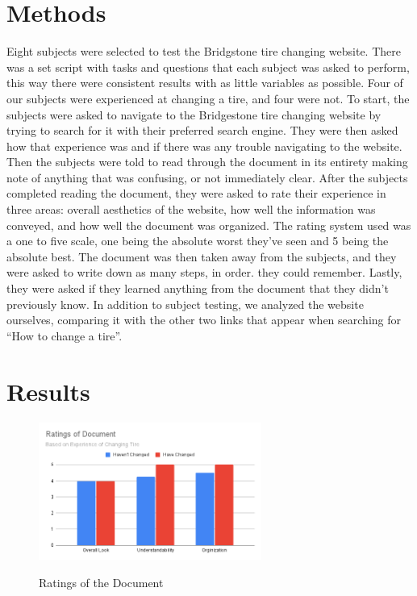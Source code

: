 \documentclass[12pt,A4paper]{article}
\begin{document}
	\section{Methods}
	Eight subjects were selected to test the Bridgstone tire changing website. There was a set script with tasks and questions that each subject was asked to perform, this way there were consistent results with as little variables as possible. Four of our subjects were experienced at changing a tire, and four were not. To start, the subjects were asked to navigate to the Bridgestone tire changing website by trying to search for it with their preferred search engine. They were then asked how that experience was and if there was any trouble navigating to the website. Then the subjects were told to read through the document in its entirety making note of anything that was confusing, or not immediately clear. After the subjects completed reading the document, they were asked to rate their experience in three areas: overall aesthetics of the website, how well the information was conveyed, and how well the document was organized. The rating system used was a one to five scale, one being the absolute worst they’ve seen and 5 being the absolute best. The document was then taken away from the subjects, and they were asked to write down as many steps, in order. they could remember. Lastly, they were asked if they learned anything from the document that they didn’t previously know. In addition to subject testing, we analyzed the website ourselves, comparing it with the other two links that appear when searching for “How to change a tire”.
	\section{Results}
	\begin{figure}[!h]
		\centering
		\includegraphics[width=0.65\textwidth]{Ratings_of_Document.png}
		\label{fig:f2}
		\caption{Ratings of the Document}
	\end{figure}
\end{document}
